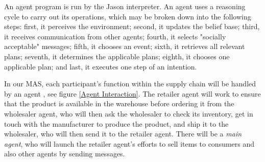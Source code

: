 An agent program is run by the Jason interpreter. An agent uses a reasoning cycle to carry out its operations, which may be broken down into the following steps: first, it perceives the environment; second, it updates the belief base; third, it receives communication from other agents; fourth, it selects "socially acceptable" messages; fifth, it chooses an event; sixth, it retrieves all relevant plans; seventh, it determines the applicable plans; eighth, it chooses one applicable plan; and last, it executes one step of an intention.

\vspace{.5cm}

In our \ac{MAS}, each participant's function within the supply chain will be handled by an agent , see figure \ref{Agent Interaction}. The retailer agent will work to ensure that the product is available in the warehouse before ordering it from the wholesaler agent, who will then ask the wholesaler to check its inventory, get in touch with the manufacturer to produce the product, and ship it to the wholesaler, who will then send it to the retailer agent. There will be a \textit{main agent}, who will launch the retailer agent's efforts to sell items to consumers and also other agents by sending messages.